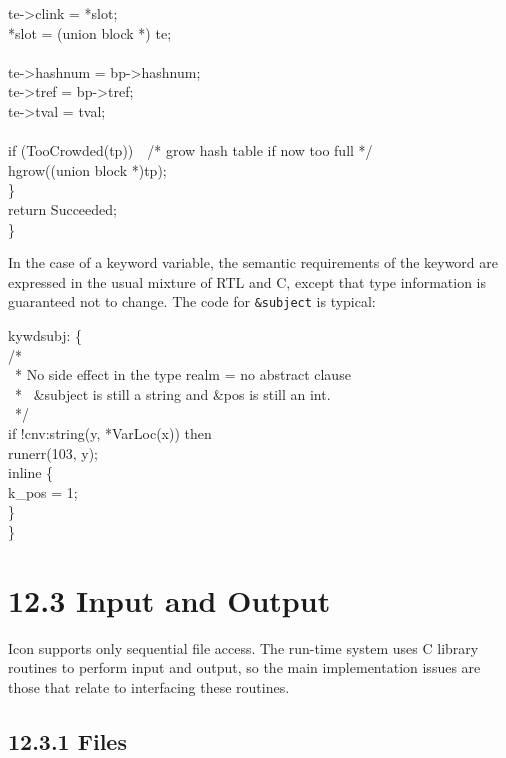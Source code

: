 \begin{iconcode}
\>\>te->clink = *slot;\\
\>\>*slot = (union block *) te;\\
\\
\>\>te->hashnum = bp->hashnum;\\
\>\>te->tref = bp->tref;\\
\>\>te->tval = tval;\\
\\
\>\>if (TooCrowded(tp))\ \ /* grow hash table if now too full */\\
\>\>\>hgrow((union block *)tp);\\
\>\>\}\\
\>return Succeeded;\\
\}
\end{iconcode}

In the case of a keyword variable, the semantic requirements
of the keyword are expressed in the usual mixture of RTL and C, except
that type information is guaranteed not to change. The code for
\texttt{\&subject} is typical:

\begin{iconcode}
\>\>kywdsubj: \{\\
\>\>\>/*\\
\>\>\>\ * No side effect in the type realm = no abstract clause\\
\>\>\>\ * \ \&subject is still a string and \&pos is still an int.\\
\>\>\>\ */\\
\>\>\>if !cnv:string(y, *VarLoc(x)) then\\
\>\>\>\>runerr(103, y);\\
\>\>\>inline \{\\
\>\>\>\>k\_pos = 1;\\
\>\>\>\>\}\\
\>\>\>\}
\end{iconcode}

\section[12.3 Input and Output]{12.3 Input and Output}

Icon supports only sequential file access. The run-time system uses C
library routines to perform input and output, so the main
implementation issues are those that relate to interfacing these
routines.

\subsection[12.3.1 Files]{12.3.1 Files}

